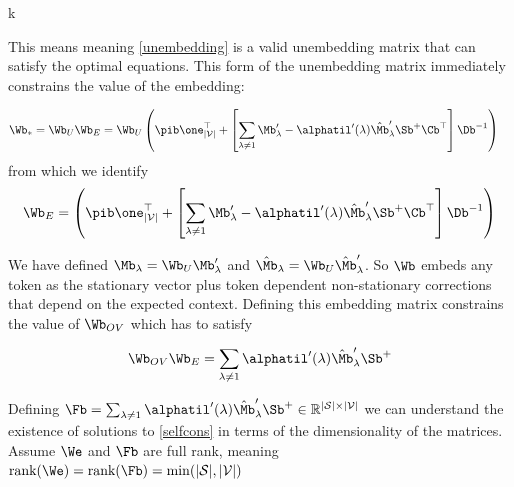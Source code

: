 k\documentclass{article}
\begin{document}
This means meaning \eqref{unembedding} is a valid unembedding matrix that can satisfy the optimal equations. This form of the unembedding matrix immediately constrains the value of the embedding:

\begin{align}
    \Wb_* = \Wb_U \Wb_E &= \Wb_U \left (\pib \one_{|\mathcal{V}|}^\top + \left[ \sum_{\lambda \neq 1} \Mb'_\lambda - \alphatil'(\lambda) \hat{\Mb}'_\lambda \Sb^+\Cb^\top\right ]  \Db^{-1}\right)
\end{align}
from which we identify 
\begin{align}
    \Wb_E = \left (\pib \one_{|\mathcal{V}|}^\top + \left[ \sum_{\lambda \neq 1} \Mb'_\lambda - \alphatil'(\lambda) \hat{\Mb}'_\lambda \Sb^{+}\Cb^\top\right ]  \Db^{-1}\right)
\end{align}

We have defined $\Mb_\lambda = \Wb_U \Mb_\lambda'$ and $\hat{\Mb}_\lambda = \Wb_U \hat{\Mb}_\lambda'$. So $\Wb$ embeds any token as the stationary vector plus token dependent non-stationary corrections that depend on the expected context. Defining this embedding matrix constrains the value of $\Wb_{OV}$ which has to satisfy 


\begin{equation}\label{selfcons}
   \Wb_{OV}\Wb_E = \sum_{\lambda\neq 1} \alphatil'(\lambda) \hat{\Mb}'_\lambda \Sb^+
\end{equation}



Defining $\Fb = \sum_{\lambda\neq 1} \alphatil'(\lambda) \hat{\Mb}'_\lambda \Sb^+ \in \mathbb{R}^{|\mathcal{S}|\times |\mathcal{V}|}$ we can understand the existence of solutions to \eqref{selfcons} in terms of the dimensionality of the matrices. Assume $\We$ and $\Fb$ are full rank, meaning $\textrm{rank}(\We) = \textrm{rank}(\Fb) = \min(|\mathcal{S}|,|\mathcal{V}|)$
\end{document}
